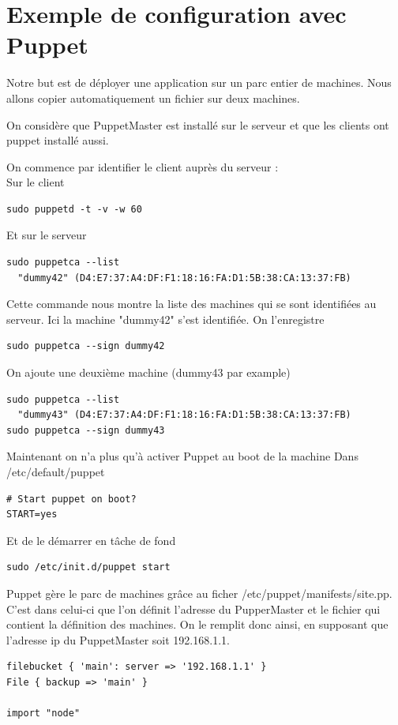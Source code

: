 \documentclass[a4paper,oneside]{report}
\begin{document}
\section{Exemple de configuration avec Puppet} \label{auto:puppet}
Notre but est de déployer une application sur un parc entier de machines.
Nous allons copier automatiquement un fichier sur deux machines.

On considère que PuppetMaster est installé sur le serveur et que les clients ont puppet installé aussi.


On commence par identifier le client auprès du serveur :\\
Sur le client
\begin{verbatim}
sudo puppetd -t -v -w 60
\end{verbatim}

Et sur le serveur
\begin{verbatim}
sudo puppetca --list
  "dummy42" (D4:E7:37:A4:DF:F1:18:16:FA:D1:5B:38:CA:13:37:FB)
\end{verbatim}

Cette commande nous montre la liste des machines qui se sont identifiées au serveur.
Ici la machine "dummy42" s'est identifiée.
On l'enregistre
\begin{verbatim}
sudo puppetca --sign dummy42
\end{verbatim}

On ajoute une deuxième machine (dummy43 par example)
\begin{verbatim}
sudo puppetca --list
  "dummy43" (D4:E7:37:A4:DF:F1:18:16:FA:D1:5B:38:CA:13:37:FB)
sudo puppetca --sign dummy43
\end{verbatim}

Maintenant on n'a plus qu'à activer Puppet au boot de la machine
Dans /etc/default/puppet
\begin{verbatim}
# Start puppet on boot?
START=yes
\end{verbatim}
Et de le démarrer en tâche de fond
\begin{verbatim}
sudo /etc/init.d/puppet start
\end{verbatim}

Puppet gère le parc de machines grâce au ficher /etc/puppet/manifests/site.pp. C'est dans celui-ci que l'on définit l'adresse du PupperMaster et le fichier qui contient la définition des machines. On le remplit donc ainsi, en supposant que l'adresse ip du PuppetMaster soit 192.168.1.1.
\begin{verbatim}
filebucket { 'main': server => '192.168.1.1' }
File { backup => 'main' }
 
import "node"
\end{verbatim}
\end{document}
